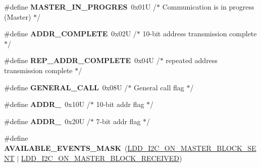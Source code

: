 \begin{DoxyCompactItemize}
\item 
\hypertarget{group___c_i2_c1__module_ga75b75f2a24a05753b06756bdef0e704e}{\#define {\bfseries M\-A\-S\-T\-E\-R\-\_\-\-I\-N\-\_\-\-P\-R\-O\-G\-R\-E\-S}~0x01\-U  /$\ast$ Communication is in progress (\-Master) $\ast$/}\label{group___c_i2_c1__module_ga75b75f2a24a05753b06756bdef0e704e}

\item 
\hypertarget{group___c_i2_c1__module_ga57e558db0dbf2476a96f5ed90320498d}{\#define {\bfseries A\-D\-D\-R\-\_\-\-C\-O\-M\-P\-L\-E\-T\-E}~0x02\-U  /$\ast$ 10-\/bit address transmission complete   $\ast$/}\label{group___c_i2_c1__module_ga57e558db0dbf2476a96f5ed90320498d}

\item 
\hypertarget{group___c_i2_c1__module_ga5c1fd7b880f8a808ae8da05aa588c39e}{\#define {\bfseries R\-E\-P\-\_\-\-A\-D\-D\-R\-\_\-\-C\-O\-M\-P\-L\-E\-T\-E}~0x04\-U  /$\ast$ repeated address transmission complete $\ast$/}\label{group___c_i2_c1__module_ga5c1fd7b880f8a808ae8da05aa588c39e}

\item 
\hypertarget{group___c_i2_c1__module_ga2a33ff60ce60da98a6f16ea3d5ff806a}{\#define {\bfseries G\-E\-N\-E\-R\-A\-L\-\_\-\-C\-A\-L\-L}~0x08\-U  /$\ast$ General call flag $\ast$/}\label{group___c_i2_c1__module_ga2a33ff60ce60da98a6f16ea3d5ff806a}

\item 
\hypertarget{group___c_i2_c1__module_ga69fee4ee235f21046f40402f682f17ec}{\#define {\bfseries A\-D\-D\-R\-\_}~0x10\-U  /$\ast$ 10-\/bit addr flag $\ast$/}\label{group___c_i2_c1__module_ga69fee4ee235f21046f40402f682f17ec}

\item 
\hypertarget{group___c_i2_c1__module_ga3ff06ca6b55e8f7bc0145a36b4396eab}{\#define {\bfseries A\-D\-D\-R\-\_}~0x20\-U  /$\ast$ 7-\/bit addr flag $\ast$/}\label{group___c_i2_c1__module_ga3ff06ca6b55e8f7bc0145a36b4396eab}

\item 
\hypertarget{group___c_i2_c1__module_ga5f04a8830cd52a3ffa1678d113f31aee}{\#define {\bfseries A\-V\-A\-I\-L\-A\-B\-L\-E\-\_\-\-E\-V\-E\-N\-T\-S\-\_\-\-M\-A\-S\-K}~(\hyperlink{group___p_e___types__module_ga187d9ac85a01b75a8f871d72b9cd5fe3}{L\-D\-D\-\_\-\-I2\-C\-\_\-\-O\-N\-\_\-\-M\-A\-S\-T\-E\-R\-\_\-\-B\-L\-O\-C\-K\-\_\-\-S\-E\-N\-T} $|$ \hyperlink{group___p_e___types__module_gac4694457514889498da89fa1afe27412}{L\-D\-D\-\_\-\-I2\-C\-\_\-\-O\-N\-\_\-\-M\-A\-S\-T\-E\-R\-\_\-\-B\-L\-O\-C\-K\-\_\-\-R\-E\-C\-E\-I\-V\-E\-D})}\label{group___c_i2_c1__module_ga5f04a8830cd52a3ffa1678d113f31aee}


\end{DoxyCompactItemize}

